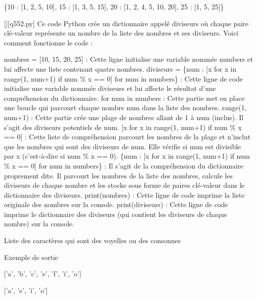 \{10 : [1, 2, 5, 10], 15 : [1, 3, 5, 15], 20 : [1, 2, 4, 5, 10, 20], 25 : [1, 5, 25]\}
        \par
        \begin{solution}
            \renewcommand{\nomfichier}{q552.py}
            \pythonfile{\chemincode \nomfichier}[][\nomfichier]
            Ce code Python crée un dictionnaire appelé diviseurs où chaque paire clé-valeur représente un nombre de la liste des nombres et ses diviseurs. Voici comment fonctionne le code :

    nombres = [10, 15, 20, 25] : Cette ligne initialise une variable nommée numbers et lui affecte une liste contenant quatre nombres.
    diviseurs = \{num : [x for x in range(1, num+1) if num \% x == 0] for num in numbers\} : Cette ligne de code initialise une variable nommée diviseurs et lui affecte le résultat d'une compréhension du dictionnaire.
        for num in numbers : Cette partie met en place une boucle qui parcourt chaque nombre num dans la liste des nombres.
        range(1, num+1) : Cette partie crée une plage de nombres allant de 1 à num (inclus). Il s'agit des diviseurs potentiels de num.
        [x for x in range(1, num+1) if num \% x == 0] : Cette liste de compréhension parcourt les nombres de la plage et n'inclut que les nombres qui sont des diviseurs de num. Elle vérifie si num est divisible par x (c'est-à-dire si num \% x == 0).
        \{num : [x for x in range(1, num+1) if num \% x == 0] for num in numbers\} : Il s'agit de la compréhension du dictionnaire proprement dite. Il parcourt les nombres de la liste des nombres, calcule les diviseurs de chaque nombre et les stocke sous forme de paires clé-valeur dans le dictionnaire des diviseurs.
    print(nombres) : Cette ligne de code imprime la liste originale des nombres sur la console.
    print(diviseurs) : Cette ligne de code imprime le dictionnaire des diviseurs (qui contient les diviseurs de chaque nombre) sur la console.
        \end{solution}
        

        \question
        Liste des caractères qui sont des voyelles ou des consonnes

Exemple de sortie

['a', 'b', 'c', 'e', 'f', 'i', 'o']

['a', 'e', 'i', 'o']

